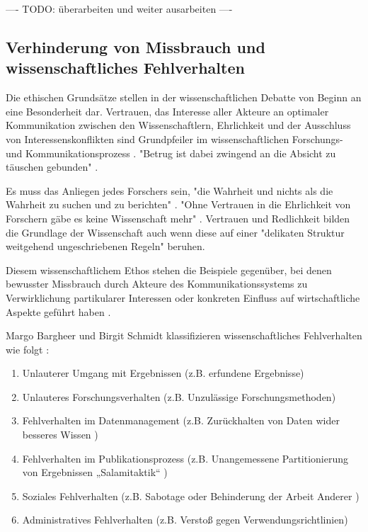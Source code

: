 ---- TODO: überarbeiten und weiter ausarbeiten ----

\subsection{Verhinderung von Missbrauch und wissenschaftliches Fehlverhalten}

Die ethischen Grundsätze stellen in der wissenschaftlichen Debatte von Beginn an eine Besonderheit dar. Vertrauen, das Interesse aller Akteure an optimaler Kommunikation zwischen den Wissenschaftlern, Ehrlichkeit und der Ausschluss von Interessenskonflikten sind Grundpfeiler im wissenschaftlichen Forschungs- und Kommunikationsprozess \cite{Bargheer_2015}. "Betrug ist dabei zwingend an die Absicht zu täuschen gebunden" \cite{Luescher_2014}.

Es muss das Anliegen jedes Forschers sein, "die Wahrheit und nichts als die Wahrheit zu suchen und zu berichten" \cite{Luescher_2014}. "Ohne Vertrauen in die Ehrlichkeit von Forschern gäbe es keine Wissenschaft mehr" \cite{hagner_2015_sache_buches}. Vertrauen und Redlichkeit bilden die Grundlage der Wissenschaft \cite{Bargheer_2015} auch wenn diese auf einer "delikaten Struktur weitgehend ungeschriebenen Regeln" \cite{grand_2012_open} beruhen.

Diesem wissenschaftlichem Ethos stehen die Beispiele gegenüber, bei denen bewusster Missbrauch durch Akteure des Kommunikationssystems zu Verwirklichung partikularer Interessen oder konkreten Einfluss auf wirtschaftliche Aspekte geführt haben \cite{Luescher_2014}  \cite{binswanger_2014_excellence} \cite{Beall_2012}.

Margo Bargheer und Birgit Schmidt klassifizieren wissenschaftliches Fehlverhalten wie folgt \cite{Bargheer_2015}:
\begin{enumerate}
\item Unlauterer Umgang mit Ergebnissen (z.B. erfundene Ergebnisse)
\item Unlauteres Forschungsverhalten (z.B. Unzulässige Forschungsmethoden)
\item Fehlverhalten im Datenmanagement (z.B. Zurückhalten von Daten wider besseres Wissen )
\item Fehlverhalten im Publikationsprozess (z.B. Unangemessene Partitionierung von Ergebnissen „Salamitaktik“  \cite{binswanger_2014_excellence})
\item Soziales Fehlverhalten (z.B. Sabotage oder Behinderung der Arbeit Anderer )
\item Administratives Fehlverhalten (z.B. Verstoß gegen Verwendungsrichtlinien)
\end{enumerate}

